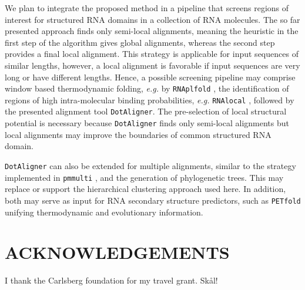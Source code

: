 \documentclass[a4paper,twoside]{article}
\newcommand\dotaligner{\texttt{DotAligner}}
\newcommand\pmmulti{\texttt{pmmulti}}
\newcommand\rnaplfold{\texttt{RNAplfold}}
\newcommand\petfold{\texttt{PETfold}}
\newcommand\rnalocal{\texttt{RNAlocal}}
\newcommand\eg{\textit{e.g.}}
\begin{document}
We plan to integrate the proposed method in a pipeline that screens
regions of interest for structured RNA domains in a collection of RNA
molecules.  The so far presented approach finds only semi-local alignments,
meaning the heuristic in the first step of the algorithm gives global
alignments, whereas the second step provides a final local alignment. This
strategy is applicable for input sequences of similar lengths, however, a
local alignment is favorable if input sequences are very long or have different
lengths.  Hence, a possible screening pipeline may comprise window based
thermodynamic folding, \eg{} by \rnaplfold{}
\cite{Bernhart:Hofacker:Stadler:Local_RNA_base:2006}, the identification of
regions of high intra-molecular binding probabilities, \eg{} \rnalocal{}
\cite{Dotu19908358}, followed by the presented alignment tool \dotaligner. The
pre-selection of local structural potential is necessary because \dotaligner{}
finds only semi-local alignments but local alignments may improve the
boundaries of common structured RNA domain. 

\dotaligner{} can also be extended for multiple alignments, similar to the strategy
implemented in \pmmulti{} \cite{Hofacker15073017}, and the generation of
phylogenetic trees. This may replace or support the hierarchical clustering
approach used here. In addition, both may serve as input for RNA secondary
structure predictors, such as \petfold{} \cite{Seemann2008} unifying
thermodynamic and evolutionary information. 


\section*{\uppercase{Acknowledgements}}

\noindent I thank the Carlsberg foundation for my travel grant. Sk\aa l!


\vfill

{\small
}


\vfill
\end{document}
